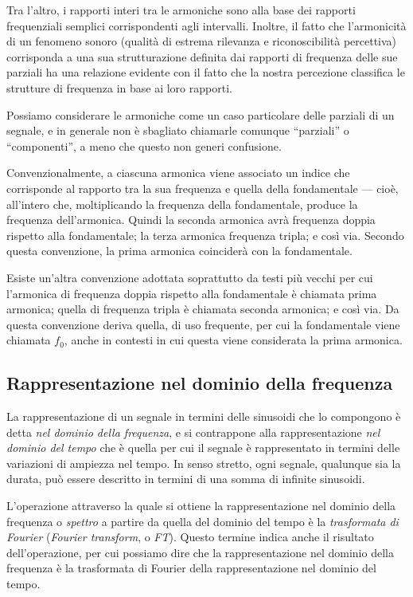 Tra l'altro, i rapporti interi tra le armoniche sono alla base dei rapporti frequenziali semplici corrispondenti agli intervalli. Inoltre, il fatto che l'armonicità di un fenomeno sonoro (qualità di estrema rilevanza e riconoscibilità percettiva) corrisponda a una sua strutturazione definita dai rapporti di frequenza delle sue parziali ha una relazione evidente con il fatto che la nostra percezione classifica le strutture di frequenza in base ai loro rapporti.

Possiamo considerare le armoniche come un caso particolare delle parziali di un segnale, e in generale non è sbagliato chiamarle comunque ``parziali'' o ``componenti'', a meno che questo non generi confusione.

Convenzionalmente, a ciascuna armonica viene associato un indice che corrisponde al rapporto tra la sua frequenza e quella della fondamentale --- cioè, all'intero che, moltiplicando la frequenza della fondamentale, produce la frequenza dell'armonica. Quindi la seconda armonica avrà frequenza doppia rispetto alla fondamentale; la terza armonica frequenza tripla; e così via. Secondo questa convenzione, la prima armonica coinciderà con la fondamentale.

Esiste un'altra convenzione adottata soprattutto da testi più vecchi per cui l'armonica di frequenza doppia rispetto alla fondamentale è chiamata prima armonica; quella di frequenza tripla è chiamata seconda armonica; e così via. Da questa convenzione deriva quella, di uso frequente, per cui la fondamentale viene chiamata $f_0$, anche in contesti in cui questa viene considerata la prima armonica.






\subsection{Rappresentazione nel dominio della frequenza}

La rappresentazione di un segnale in termini delle sinusoidi che lo compongono è detta \emph{nel dominio della frequenza}, e si contrappone alla rappresentazione \emph{nel dominio del tempo} che è quella per cui il segnale è rappresentato in termini delle variazioni di ampiezza nel tempo. In senso stretto, ogni segnale, qualunque sia la durata, può essere descritto in termini di una somma di infinite sinusoidi. 

L'operazione attraverso la quale si ottiene la rappresentazione nel dominio della frequenza o \emph{spettro} a partire da quella del dominio del tempo è la \emph{trasformata di Fourier} (\emph{Fourier transform}, o \emph{FT}). Questo termine indica anche il risultato dell'operazione, per cui possiamo dire che la rappresentazione nel dominio della frequenza è la trasformata di Fourier della rappresentazione nel dominio del tempo. 

